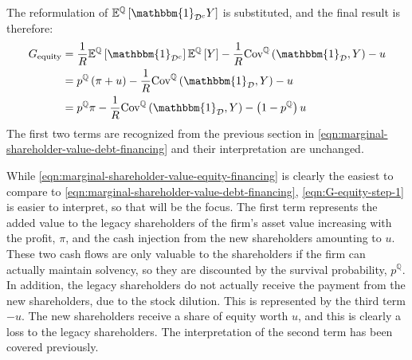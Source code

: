 \documentclass[main.tex]{subfiles}
\begin{document}
        The reformulation of $\mathbb{E}^{\mathbb{Q}}\left[\mathbbm{1}_{\mathcal{D}^{c}} Y\right]$ is substituted, 
        and the final result is therefore:
            \begin{align}
                G_{\text{equity}} &=
                    \discountfactor
                    \mathbb{E}^{\mathbb{Q}}\left[\mathbbm{1}_{\mathcal{D}^{c}}\right]
                    \mathbb{E}^{\mathbb{Q}}\left[Y\right]
                    -
                    \discountfactor
                    \text{Cov}^{\mathbb{Q}}\left(
                        \mathbbm{1}_{\mathcal{D}},
                        Y
                    \right)
                    -
                    u
                    \nonumber \\
                &= 
                    p^{\mathbb{Q}}
                    \left(
                        \pi
                        +
                        u
                    \right)
                    -
                    \discountfactor
                    \text{Cov}^{\mathbb{Q}}\left(
                        \mathbbm{1}_{\mathcal{D}},
                        Y
                    \right)
                    -
                    u 
                    \label{eqn:G-equity-step-1} \\
                &= 
                    p^{\mathbb{Q}}
                    \pi
                    -
                    \discountfactor
                    \text{Cov}^{\mathbb{Q}}\left(
                        \mathbbm{1}_{\mathcal{D}},
                        Y
                    \right)
                    -
                    \left(
                        1
                        -
                        p^{\mathbb{Q}}
                    \right)
                    u 
                \label{eqn:marginal-shareholder-value-equity-financing}
            \end{align}
        The first two terms are recognized from the previous section in 
        \cref{eqn:marginal-shareholder-value-debt-financing}
        and their interpretation are unchanged. 

        While \cref{eqn:marginal-shareholder-value-equity-financing} is clearly the easiest to compare to 
        \cref{eqn:marginal-shareholder-value-debt-financing},
        \cref{eqn:G-equity-step-1} is easier to interpret, so that will be the focus.
        The first term represents the added value to the legacy shareholders of 
        the firm's asset value increasing with the profit, $\pi$,
        and the cash injection from the new shareholders amounting to $u$.
        These two cash flows are only valuable to the shareholders if the firm can actually maintain solvency,
        so they are discounted by the survival probability, $p^{\mathbb{Q}}$.
        In addition, the legacy shareholders do not actually receive 
        the payment from the new shareholders, due to the stock dilution.
        This is represented by the third term $-u$.
        The new shareholders receive a share of equity worth $u$, 
        and this is clearly a loss to the legacy shareholders.
        The interpretation of the second term has been covered previously.
\end{document}
